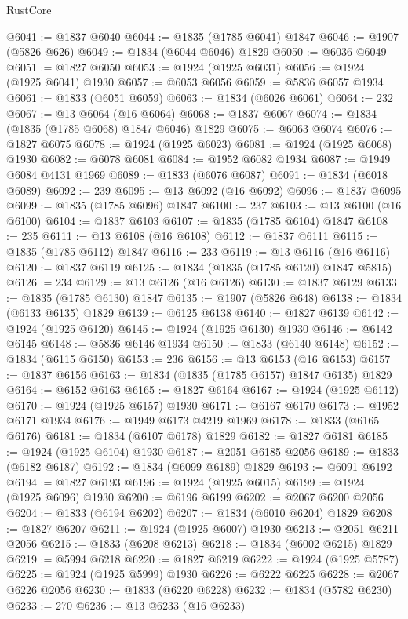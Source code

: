 \begin{lexlean}{RustCore}
\begin{coremodule}
@6041 := @1837 @6040
@6044 := @1835 (@1785 @6041) @1847
@6046 := @1907 (@5826 @626)
@6049 := @1834 (@6044 @6046) @1829
@6050 := @6036 @6049
@6051 := @1827 @6050
@6053 := @1924 (@1925 @6031)
@6056 := @1924 (@1925 @6041) @1930
@6057 := @6053 @6056
@6059 := @5836 @6057 @1934
@6061 := @1833 (@6051 @6059)
@6063 := @1834 (@6026 @6061)
@6064 := 232
@6067 := @13 @6064 (@16 @6064)
@6068 := @1837 @6067
@6074 := @1834 (@1835 (@1785 @6068) @1847 @6046) @1829
@6075 := @6063 @6074
@6076 := @1827 @6075
@6078 := @1924 (@1925 @6023)
@6081 := @1924 (@1925 @6068) @1930
@6082 := @6078 @6081
@6084 := @1952 @6082 @1934
@6087 := @1949 @6084 @4131 @1969
@6089 := @1833 (@6076 @6087)
@6091 := @1834 (@6018 @6089)
@6092 := 239
@6095 := @13 @6092 (@16 @6092)
@6096 := @1837 @6095
@6099 := @1835 (@1785 @6096) @1847
@6100 := 237
@6103 := @13 @6100 (@16 @6100)
@6104 := @1837 @6103
@6107 := @1835 (@1785 @6104) @1847
@6108 := 235
@6111 := @13 @6108 (@16 @6108)
@6112 := @1837 @6111
@6115 := @1835 (@1785 @6112) @1847
@6116 := 233
@6119 := @13 @6116 (@16 @6116)
@6120 := @1837 @6119
@6125 := @1834 (@1835 (@1785 @6120) @1847 @5815)
@6126 := 234
@6129 := @13 @6126 (@16 @6126)
@6130 := @1837 @6129
@6133 := @1835 (@1785 @6130) @1847
@6135 := @1907 (@5826 @648)
@6138 := @1834 (@6133 @6135) @1829
@6139 := @6125 @6138
@6140 := @1827 @6139
@6142 := @1924 (@1925 @6120)
@6145 := @1924 (@1925 @6130) @1930
@6146 := @6142 @6145
@6148 := @5836 @6146 @1934
@6150 := @1833 (@6140 @6148)
@6152 := @1834 (@6115 @6150)
@6153 := 236
@6156 := @13 @6153 (@16 @6153)
@6157 := @1837 @6156
@6163 := @1834 (@1835 (@1785 @6157) @1847 @6135) @1829
@6164 := @6152 @6163
@6165 := @1827 @6164
@6167 := @1924 (@1925 @6112)
@6170 := @1924 (@1925 @6157) @1930
@6171 := @6167 @6170
@6173 := @1952 @6171 @1934
@6176 := @1949 @6173 @4219 @1969
@6178 := @1833 (@6165 @6176)
@6181 := @1834 (@6107 @6178) @1829
@6182 := @1827 @6181
@6185 := @1924 (@1925 @6104) @1930
@6187 := @2051 @6185 @2056
@6189 := @1833 (@6182 @6187)
@6192 := @1834 (@6099 @6189) @1829
@6193 := @6091 @6192
@6194 := @1827 @6193
@6196 := @1924 (@1925 @6015)
@6199 := @1924 (@1925 @6096) @1930
@6200 := @6196 @6199
@6202 := @2067 @6200 @2056
@6204 := @1833 (@6194 @6202)
@6207 := @1834 (@6010 @6204) @1829
@6208 := @1827 @6207
@6211 := @1924 (@1925 @6007) @1930
@6213 := @2051 @6211 @2056
@6215 := @1833 (@6208 @6213)
@6218 := @1834 (@6002 @6215) @1829
@6219 := @5994 @6218
@6220 := @1827 @6219
@6222 := @1924 (@1925 @5787)
@6225 := @1924 (@1925 @5999) @1930
@6226 := @6222 @6225
@6228 := @2067 @6226 @2056
@6230 := @1833 (@6220 @6228)
@6232 := @1834 (@5782 @6230)
@6233 := 270
@6236 := @13 @6233 (@16 @6233)

\end{coremodule}
\end{lexlean}
